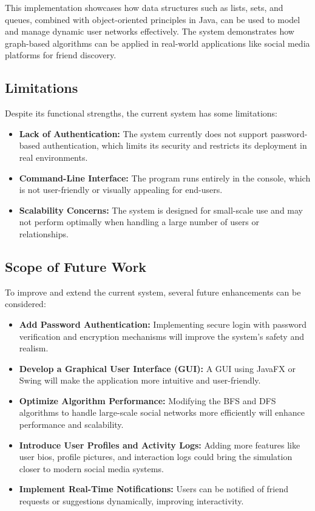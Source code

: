 \documentclass[12pt]{report}
\begin{document}
This implementation showcases how data structures such as lists, sets, and queues, combined with object-oriented principles in Java, can be used to model and manage dynamic user networks effectively. The system demonstrates how graph-based algorithms can be applied in real-world applications like social media platforms for friend discovery.

\subsection{Limitations}
Despite its functional strengths, the current system has some limitations:

\begin{itemize}
    \item \textbf{Lack of Authentication:} The system currently does not support password-based authentication, which limits its security and restricts its deployment in real environments.
    
    \item \textbf{Command-Line Interface:} The program runs entirely in the console, which is not user-friendly or visually appealing for end-users.
    
    \item \textbf{Scalability Concerns:} The system is designed for small-scale use and may not perform optimally when handling a large number of users or relationships.
\end{itemize}

\subsection{Scope of Future Work}
To improve and extend the current system, several future enhancements can be considered:

\begin{itemize}
    \item \textbf{Add Password Authentication:} Implementing secure login with password verification and encryption mechanisms will improve the system's safety and realism.
    
    \item \textbf{Develop a Graphical User Interface (GUI):} A GUI using JavaFX or Swing will make the application more intuitive and user-friendly.
    
    \item \textbf{Optimize Algorithm Performance:} Modifying the BFS and DFS algorithms to handle large-scale social networks more efficiently will enhance performance and scalability.
    
    \item \textbf{Introduce User Profiles and Activity Logs:} Adding more features like user bios, profile pictures, and interaction logs could bring the simulation closer to modern social media systems.
    
    \item \textbf{Implement Real-Time Notifications:} Users can be notified of friend requests or suggestions dynamically, improving interactivity.
\end{itemize}
\end{document}
